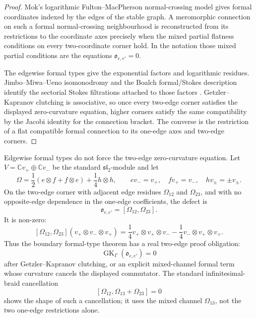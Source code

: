 \begin{proof}
Mok's logarithmic Fulton--MacPherson normal-crossing model
\cite{Mok25} gives formal coordinates indexed by the edges of the
stable graph. A meromorphic connection on such a formal
normal-crossing neighbourhood is reconstructed from its restrictions
to the coordinate axes precisely when the mixed partial flatness
conditions on every two-coordinate corner hold. In the
notation those mixed partial conditions are the equations
\(\mathfrak{o}_{e,e'}=0\).

The edgewise formal types give the exponential factors and
logarithmic residues. Jimbo--Miwa--Ueno isomonodromy and the
Boalch formal/Stokes description identify the sectorial Stokes
filtrations attached to those factors
\cite{JMU81,Boalch2001,Boalch2014}. Getzler--Kapranov clutching is
associative, so once every two-edge corner satisfies the displayed
zero-curvature equation, higher corners satisfy the same compatibility
by the Jacobi identity for the connection bracket. The converse is
the restriction of a flat compatible formal connection to its
one-edge axes and two-edge corners.
\end{proof}

\begin{proposition}
\label{prop:kzb-two-edge-corner-defect-nonzero}
\ClaimStatusProvedHere
Edgewise formal types do not force the two-edge zero-curvature
equation. Let
\(V = \mathbb C v_{+}\oplus \mathbb C v_{-}\) be the standard
\(\mathfrak{sl}_{2}\)-module and let
\[
 \Omega
 =
 \frac{1}{2}(e\otimes f+f\otimes e)
 +
 \frac{1}{4}h\otimes h,
 \qquad
 e v_- = v_+,\quad f v_+ = v_-,\quad h v_\pm=\pm v_\pm .
\]
On the two-edge corner with adjacent edge residues
\(\Omega_{12}\) and \(\Omega_{23}\), and with no opposite-edge
dependence in the one-edge coefficients, the defect is
\[
 \mathfrak{o}_{e,e'}
 =
 [\Omega_{12},\Omega_{23}].
\]
It is non-zero:
\[
 [\Omega_{12},\Omega_{23}]
 (v_+\otimes v_-\otimes v_+)
 =
 \frac{1}{4}v_+\otimes v_+\otimes v_-
 -
 \frac{1}{4}v_-\otimes v_+\otimes v_+ .
\]
Thus the boundary formal-type theorem has a real two-edge proof
obligation:
\[
 \operatorname{GK}_{\Gamma}(\mathfrak{o}_{e,e'})=0
\]
after Getzler--Kapranov clutching, or an explicit mixed-channel
formal term whose curvature cancels the displayed commutator. The
standard infinitesimal-braid cancellation
\[
 [\Omega_{12},\Omega_{13}+\Omega_{23}]=0
\]
shows the shape of such a cancellation; it uses the mixed channel
\(\Omega_{13}\), not the two one-edge restrictions alone.
\end{proposition}

